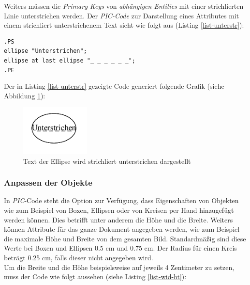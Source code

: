 \noindent
Weiters müssen die \textit{Primary Keys} von \textit{abhängigen Entities} mit einer strichlierten Linie unterstrichen werden. Der \textit{PIC-Code} zur Darstellung eines Attributes mit einem strichliert unterstrichenem Text sieht wie folgt aus (Listing \ref{list-unterstr}):

\lstset{frame=lines}
\lstset{basicstyle=\footnotesize}
\begin{lstlisting}
.PS
ellipse "Unterstrichen";
ellipse at last ellipse "_ _ _ _ _ _";
.PE
\end{lstlisting}

\noindent
Der in Listing \ref{list-unterstr} gezeigte Code generiert folgende Grafik (siehe Abbildung \ref{strichl_unter}):
\begin{figure}[H]
	\begin{center}
		\includegraphics[width=3.5cm]{images/Ellipse_strichliert.png}
		\caption{Text der Ellipse wird strichliert unterstrichen dargestellt}
		\label{strichl_unter}
	\end{center}
\end{figure}

\subsubsection{Anpassen der Objekte}
\pra

\noindent
In \textit{PIC}-Code steht die Option zur Verfügung, dass Eigenschaften von Objekten wie zum Beispiel von Boxen, Ellipsen oder von Kreisen per Hand hinzugefügt werden können. Dies betrifft unter anderem die Höhe und die Breite. Weiters können Attribute für das ganze Dokument angegeben werden, wie zum Beispiel die maximale Höhe und Breite von dem gesamten Bild. Standardmäßig sind diese Werte bei Boxen und Ellipsen 0.5 cm und 0.75 cm. Der Radius für einen Kreis beträgt 0.25 cm, falls dieser nicht angegeben wird. 
\\

\noindent
Um die Breite und die Höhe beispielsweise auf jeweils 4 Zentimeter zu setzen, muss der Code wie folgt aussehen (siehe Listing \ref{list-wid-ht}):

